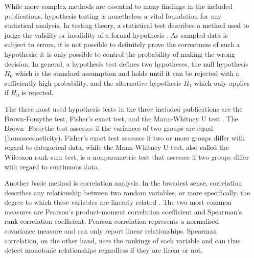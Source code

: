 \noindent While\label{mar:tests} more complex
methods are essential to many findings in the included publications,
hypothesis testing is nonetheless a vital foundation for any statistical
analysis. In testing theory, a statistical test describes a method used to
judge the validity or invalidity of a formal hypothesis \citep{Teunissen2006}.
As sampled data is subject to errors, it is not possible to definitely prove
the correctness of such a hypothesis; it is only possible to control the
probability of making the wrong decision. In general, a hypothesis test
defines two hypotheses, the null hypothesis $H_{0}$ which is the standard
assumption and holds until it can be rejected with a sufficiently high
probability, and the alternative hypothesis $H_{1}$ which only applies if
$H_{0}$ is rejected.

The three most used hypothesis tests in the three included publications are
the Brown-Forsythe test, Fisher's exact test, and the Mann-Whitney U test
\citep{Fisher1922,Wilcoxon1945,Mann1947,Brown1974,Winters2010}. The Brown-
Forsythe test assesses if the variances of two groups are equal
(homoscedasticity). Fisher's exact test assesses if two or more groups differ
with regard to categorical data, while the Mann-Whitney U test, also called
the Wilcoxon rank-sum test, is a nonparametric test that assesses if two
groups differ with regard to continuous data.
\bigbreak

\noindent Another\label{mar:cor} basic method is
correlation analysis. In the broadest sense, correlation describes any
relationship between two random variables, or more specifically, the degree to
which these variables are linearly related \citep{Mann1947}. The two most
common measures are Pearson's product-moment correlation coefficient and
Spearman's rank correlation coefficient. Pearson correlation represents a
normalised covariance measure and can only report linear relationships.
Spearman correlation, on the other hand, uses the rankings of each variable
and can thus detect monotonic relationships regardless if they are linear or
not.
\bigbreak

